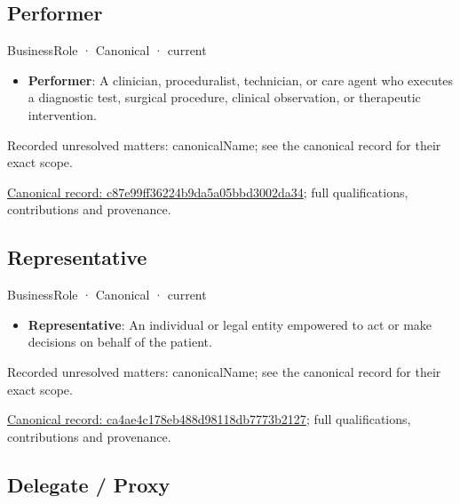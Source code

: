 \subsection{Performer}

\label{element:c87e99ff36224b9da5a05bbd3002da34}
{\small BusinessRole · Canonical · current}\par

\begin{itemize}


\item \textbf{Performer}: A clinician, proceduralist, technician, or care agent who executes a diagnostic test, surgical procedure, clinical observation, or therapeutic intervention.

\end{itemize}

{\small Recorded unresolved matters: canonicalName; see the canonical record for their exact scope.}\par
{\footnotesize \href{../../../../continuum/business/business-role/c87e99ff36224b9da5a05bbd3002da34.md}{Canonical record: c87e99ff36224b9da5a05bbd3002da34}; full qualifications, contributions and provenance.}\par
\subsection{Representative}

\label{element:ca4ae4c178eb488d98118db7773b2127}
{\small BusinessRole · Canonical · current}\par

\begin{itemize}


\item \textbf{Representative}: An individual or legal entity empowered to act or make decisions on behalf of the patient.

\end{itemize}

{\small Recorded unresolved matters: canonicalName; see the canonical record for their exact scope.}\par
{\footnotesize \href{../../../../continuum/business/business-role/ca4ae4c178eb488d98118db7773b2127.md}{Canonical record: ca4ae4c178eb488d98118db7773b2127}; full qualifications, contributions and provenance.}\par
\subsection{Delegate / Proxy}

